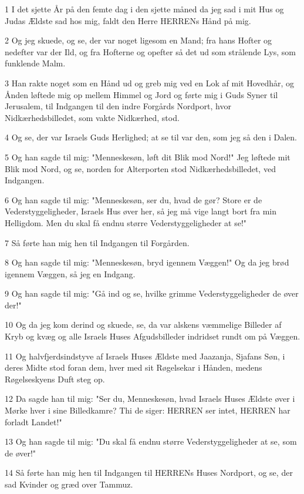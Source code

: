 \par 1 I det sjette År på den femte dag i den sjette måned da jeg sad i mit Hus og Judas Ældste sad hos mig, faldt den Herre HERRENs Hånd på mig.
\par 2 Og jeg skuede, og se, der var noget ligesom en Mand; fra hans Hofter og nedefter var der Ild, og fra Hofterne og opefter så det ud som strålende Lys, som funklende Malm.
\par 3 Han rakte noget som en Hånd ud og greb mig ved en Lok af mit Hovedhår, og Ånden løftede mig op mellem Himmel og Jord og førte mig i Guds Syner til Jerusalem, til Indgangen til den indre Forgårds Nordport, hvor Nidkærhedsbilledet, som vakte Nidkærhed, stod.
\par 4 Og se, der var Israels Guds Herlighed; at se til var den, som jeg så den i Dalen.
\par 5 Og han sagde til mig: "Menneskesøn, løft dit Blik mod Nord!" Jeg løftede mit Blik mod Nord, og se, norden for Alterporten stod Nidkærhedsbilledet, ved Indgangen.
\par 6 Og han sagde til mig: "Menneskesøn, ser du, hvad de gør? Store er de Vederstyggeligheder, Israels Hus øver her, så jeg må vige langt bort fra min Helligdom. Men du skal få endnu større Vederstyggeligheder at se!"
\par 7 Så førte han mig hen til Indgangen til Forgården.
\par 8 Og han sagde til mig: "Menneskesøn, bryd igennem Væggen!" Og da jeg brød igennem Væggen, så jeg en Indgang.
\par 9 Og han sagde til mig: "Gå ind og se, hvilke grimme Vederstyggeligheder de øver der!"
\par 10 Og da jeg kom derind og skuede, se, da var alskens væmmelige Billeder af Kryb og kvæg og alle Israels Huses Afgudsbilleder indridset rundt om på Væggen.
\par 11 Og halvfjerdsindstyve af Israels Huses Ældste med Jaazanja, Sjafans Søn, i deres Midte stod foran dem, hver med sit Røgelsekar i Hånden, medens Røgelseskyens Duft steg op.
\par 12 Da sagde han til mig: "Ser du, Menneskesøn, hvad Israels Huses Ældste øver i Mørke hver i sine Billedkamre? Thi de siger: HERREN ser intet, HERREN har forladt Landet!"
\par 13 Og han sagde til mig: "Du skal få endnu større Vederstyggeligheder at se, som de øver!"
\par 14 Så førte han mig hen til Indgangen til HERRENs Huses Nordport, og se, der sad Kvinder og græd over Tammuz.

